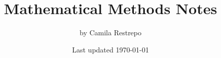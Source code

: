 \documentclass{notes}
\title{\bfseries Mathematical Methods Notes}
\author{by Camila Restrepo}
\date{Last updated \today}
\begin{document}
\maketitle
\toccontents
\frontpagewarning


\end{document}
